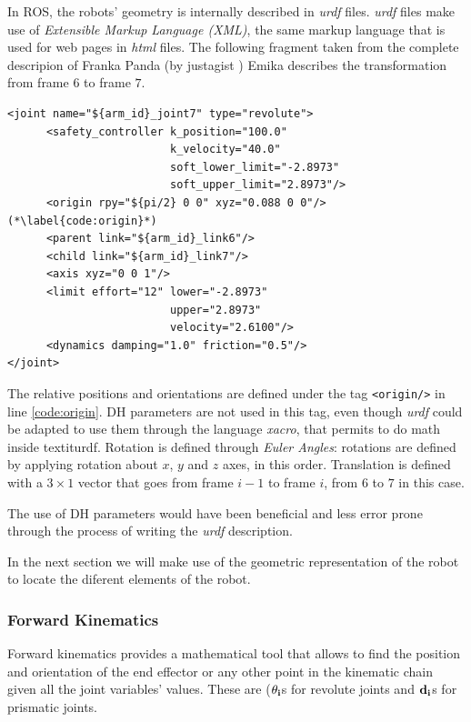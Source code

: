 In ROS, the robots' geometry is internally described in \textit{urdf} files. \textit{urdf} files make use of \textit{Extensible Markup Language (XML)}, the same markup language that is used for web pages in \textit{html} files. The following fragment taken from the complete descripion of Franka Panda (by justagist \cite{justagist}) Emika describes the transformation from frame $6$ to frame $7$.

\begin{lstlisting}[caption={Fragment of panda\_arm.urdf},captionpos=b]
<joint name="${arm_id}_joint7" type="revolute">
      <safety_controller k_position="100.0"
                         k_velocity="40.0"
                         soft_lower_limit="-2.8973"
                         soft_upper_limit="2.8973"/>
      <origin rpy="${pi/2} 0 0" xyz="0.088 0 0"/> (*\label{code:origin}*)
      <parent link="${arm_id}_link6"/>
      <child link="${arm_id}_link7"/>
      <axis xyz="0 0 1"/>
      <limit effort="12" lower="-2.8973"
                         upper="2.8973"
                         velocity="2.6100"/>
      <dynamics damping="1.0" friction="0.5"/>
</joint>
\end{lstlisting}

The relative positions and orientations are defined under the tag \lstinline{<origin/>} in line \ref{code:origin}. DH parameters are not used in this tag, even though \textit{urdf} could be adapted to use them through the language \textit{xacro}, that permits to do math inside textit{urdf}. Rotation is defined through \textit{Euler Angles}:  rotations are defined by applying rotation about $x$, $y$ and $z$ axes, in this order. Translation is defined with a $3 \times 1$ vector that goes from frame $i-1$ to frame $i$, from $6$ to $7$ in this case.

The use of DH parameters would have been beneficial and less error prone through the process of writing the \textit{urdf} description.

In the next section we will make use of the geometric representation of the robot to locate the diferent elements of the robot.

\subsubsection{Forward Kinematics}
\label{sss:FK}

Forward kinematics provides a mathematical tool that allows to find the position and orientation of the end effector or any other point in the kinematic chain given all the joint variables' values. These are ($\bf{\theta_i}$s for revolute joints and $\bf{d_i}$s for prismatic joints.

